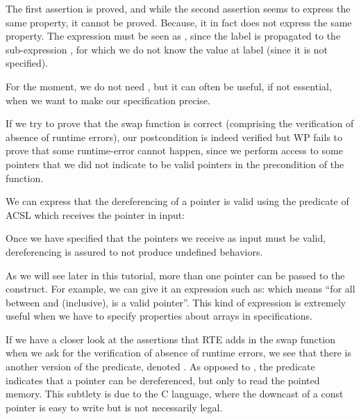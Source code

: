 The first assertion is proved, and while the second assertion seems to
express the same property, it cannot be proved. Because, it in fact does not
express the same property. The expression
 must be seen as
, since the
label is propagated to the sub-expression , for which we do
not know the value at label  (since it is not specified).


For the moment, we do not need , but it can
often be useful, if not essential, when we want to make our
specification precise.





If we try to prove that the swap function is correct (comprising the
verification of absence of runtime errors), our postcondition is indeed verified
but WP fails to prove that some runtime-error cannot happen, since we perform
access to some pointers that we did not indicate to be valid pointers in the
precondition of the function.

We can express that the dereferencing of a pointer is valid using the
 predicate of ACSL which receives the
pointer in input:






Once we have specified that the pointers we receive as input must be valid,
dereferencing is assured to not produce undefined behaviors.



As we will see later in this tutorial, more than one pointer can be
passed to the  construct.
For example, we can give it
an expression such as:  which means
``for all  between  and  (inclusive),
 is a valid pointer''. This kind of expression is
extremely useful when we have to specify properties about arrays in
specifications.



If we have a closer look at the assertions that RTE adds in the swap function
when we ask for the verification of absence of runtime errors, we see that
there is another version of the 
predicate, denoted . As opposed to
, the predicate
 indicates that a pointer can be
dereferenced, but only to read the pointed memory. This subtlety is due to the C
language, where the downcast of a const pointer is easy to write but is not
necessarily legal.



